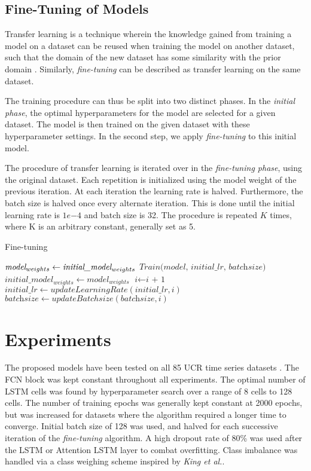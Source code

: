 \documentclass[article]{IEEEtran}
\begin{document}
\subsection{Fine-Tuning of Models}
Transfer learning is a technique wherein the knowledge gained from training a model on a dataset can be reused when training the model on another dataset, such that the domain of the new dataset has some similarity with the prior domain \cite{yosinski2014transferable}. Similarly, \textit{fine-tuning} can be described as transfer learning on the same dataset.

The training procedure can thus be split into two distinct phases. In the \textit{initial phase}\label{phase1}, the optimal hyperparameters for the model are selected for a given dataset. The model is then trained on the given dataset with these hyperparameter settings. In the second step, we apply \textit{fine-tuning} to this initial model.

The procedure of transfer learning is iterated over in the \textit{fine-tuning phase}\label{phase2}, using the original dataset. Each repetition is initialized using the model weight of the previous iteration. At each iteration the learning rate is halved. Furthermore, the batch size is halved once every alternate iteration. This is done until the initial learning rate is $1e{-4}$ and batch size is 32. The procedure is repeated $K$ times, where K is an arbitrary constant, generally set as 5.

\begin{algorithm}
\begin{algorithmic}[1]
\caption{Fine-tuning}\label{finetuning}
\State $\textit{model}_{weights} \gets \textit{\textit{initial\_model}}_{weights}$
\State $\textit{Train(model, initial\_lr, batchsize)}$
\State $\textit{initial\_model}_{weights} \gets \textit{model}_{weights}$
\State $\textit{i} \gets \textit{i + 1}$
\State $\textit{initial\_lr} \gets updateLearningRate(\textit{initial\_lr}, \textit{i})$
\State $\textit{batchsize} \gets updateBatchsize(\textit{batchsize}, \textit{i})$
\EndFor
\end{algorithmic}
\end{algorithm} 
\section{Experiments}
\label{Experiments}
The proposed models have been tested on all 85 UCR time series datasets \cite{UCRArchive}. The FCN block was kept constant throughout all experiments. The optimal number of LSTM cells was found by hyperparameter search over a range of 8 cells to 128 cells. The number of training epochs was generally kept constant at 2000 epochs, but was increased for datasets where the algorithm required a longer time to converge. Initial batch size of 128 was used, and halved for each successive iteration of the \textit{fine-tuning} algorithm. A high dropout rate of 80\% was used after the LSTM or Attention LSTM layer to combat overfitting. Class imbalance was handled via a class weighing scheme inspired by \textit{King et al.}\cite{king2001logistic}.
\end{document}
